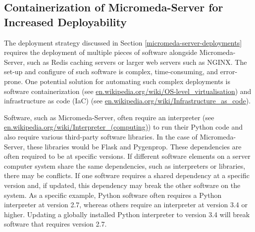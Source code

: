 \subsection{Containerization of Micromeda-Server for Increased Deployability}

The deployment strategy discussed in Section \ref{micromeda-server-deployments} requires the deployment of multiple pieces of software alongside Micromeda-Server, such as Redis caching servers or larger web servers such as NGINX. The set-up and configure of such software is complex, time-consuming, and error-prone. One potential solution for automating such complex deployments is software containerization \cite{syed2015software} (see \href{en.wikipedia.org/wiki/OS-level\_virtualisation}{en.wikipedia.org/wiki/OS-level\_virtualisation}) and infrastructure as code (IaC) \cite{artac2017devops} (see \href{en.wikipedia.org/wiki/Infrastructure\_as\_code}{en.wikipedia.org/wiki/Infrastructure\_as\_code}). 

Software, such as Micromeda-Server, often require an interpreter \cite{bennett1952interpretative} (see \href{en.wikipedia.org/wiki/Interpreter\_(computing)}{en.wikipedia.org/wiki/Interpreter\_(computing)}) to run their Python code and also require various third-party software libraries. In the case of Micromeda-Server, these libraries would be Flask and Pygenprop. These dependencies are often required to be at specific versions. If different software elements on a server computer system share the same dependencies, such as interpreters or libraries, there may be conflicts. If one software requires a shared dependency at a specific version and, if updated, this dependency may break the other software on the system. As a specific example, Python software often requires a Python interpreter at version 2.7, whereas others require an interpreter at version 3.4 or higher. Updating a globally installed Python interpreter to version 3.4 will break software that requires version 2.7. 

